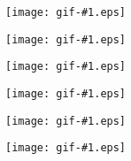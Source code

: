 \documentclass{article}
\def\f1#1{\texttt{[image: gif-\#1.eps]}}
\begin{document}
\f1{01}

\f1{02}

\f1{03}

\f1{04}

\f1{05}

\f1{06}
\end{document}
